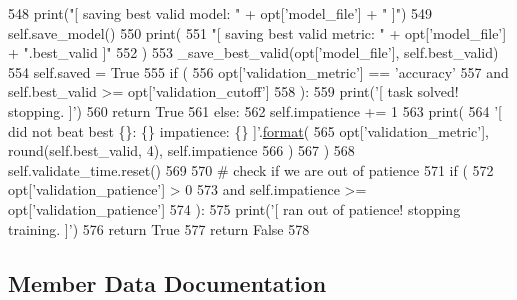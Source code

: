 \begin{DoxyCode}
548                 print(\textcolor{stringliteral}{"[ saving best valid model: "} + opt[\textcolor{stringliteral}{'model\_file'}] + \textcolor{stringliteral}{" ]"})
549                 self.save\_model()
550                 print(
551                     \textcolor{stringliteral}{"[ saving best valid metric: "} + opt[\textcolor{stringliteral}{'model\_file'}] + \textcolor{stringliteral}{".best\_valid ]"}
552                 )
553                 \_save\_best\_valid(opt[\textcolor{stringliteral}{'model\_file'}], self.best\_valid)
554                 self.saved = \textcolor{keyword}{True}
555             \textcolor{keywordflow}{if} (
556                 opt[\textcolor{stringliteral}{'validation\_metric'}] == \textcolor{stringliteral}{'accuracy'}
557                 \textcolor{keywordflow}{and} self.best\_valid >= opt[\textcolor{stringliteral}{'validation\_cutoff'}]
558             ):
559                 print(\textcolor{stringliteral}{'[ task solved! stopping. ]'})
560                 \textcolor{keywordflow}{return} \textcolor{keyword}{True}
561         \textcolor{keywordflow}{else}:
562             self.impatience += 1
563             print(
564                 \textcolor{stringliteral}{'[ did not beat best \{\}: \{\} impatience: \{\} ]'}.\hyperlink{namespaceparlai_1_1chat__service_1_1services_1_1messenger_1_1shared__utils_a32e2e2022b824fbaf80c747160b52a76}{format}(
565                     opt[\textcolor{stringliteral}{'validation\_metric'}], round(self.best\_valid, 4), self.impatience
566                 )
567             )
568         self.validate\_time.reset()
569 
570         \textcolor{comment}{# check if we are out of patience}
571         \textcolor{keywordflow}{if} (
572             opt[\textcolor{stringliteral}{'validation\_patience'}] > 0
573             \textcolor{keywordflow}{and} self.impatience >= opt[\textcolor{stringliteral}{'validation\_patience'}]
574         ):
575             print(\textcolor{stringliteral}{'[ ran out of patience! stopping training. ]'})
576             \textcolor{keywordflow}{return} \textcolor{keyword}{True}
577         \textcolor{keywordflow}{return} \textcolor{keyword}{False}
578 
\end{DoxyCode}


\subsection{Member Data Documentation}
\mbox{\label{classparlai_1_1scripts_1_1train__model_1_1TrainLoop_a04b7275f3ab548989a48161a7f1b8f3c}} 
